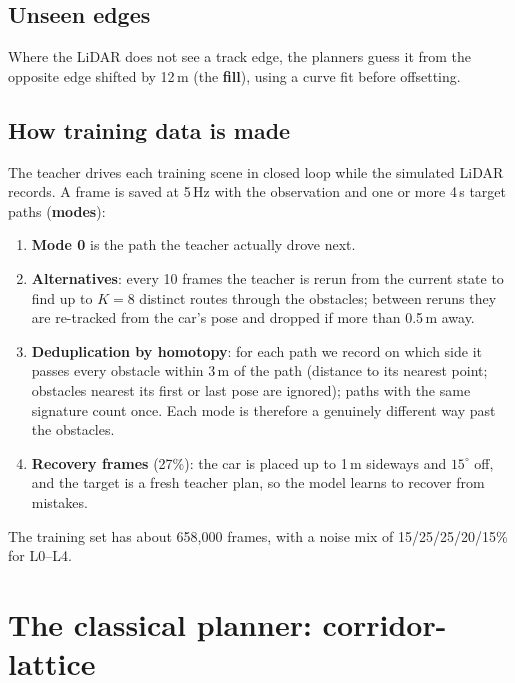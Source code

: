 \documentclass[11pt,a4paper]{article}
\newcommand{\term}[1]{\textbf{#1}}
\begin{document}
\subsection{Unseen edges}
Where the LiDAR does not see a track edge, the planners guess it from the opposite edge shifted by 12\,m
(the \term{fill}), using a curve fit before offsetting.

\subsection{How training data is made}
\label{sec:data}
The teacher drives each training scene in closed loop while the simulated LiDAR records. A frame is saved
at 5\,Hz with the observation and one or more 4\,s target paths (\term{modes}):
\begin{enumerate}[nosep]
  \item \textbf{Mode 0} is the path the teacher actually drove next.
  \item \textbf{Alternatives}: every 10 frames the teacher is rerun from the current state to find up to
        $K=8$ distinct routes through the obstacles; between reruns they are re-tracked from the car's pose
        and dropped if more than 0.5\,m away.
  \item \textbf{Deduplication by homotopy}: for each path we record on which side it passes every obstacle
        within 3\,m of the path (distance to its nearest point; obstacles nearest its first or last pose are
        ignored); paths with the same signature count once. Each mode is therefore a genuinely
        different way past the obstacles.
  \item \textbf{Recovery frames} (27\%): the car is placed up to 1\,m sideways and $15^\circ$ off, and the
        target is a fresh teacher plan, so the model learns to recover from mistakes.
\end{enumerate}
The training set has about 658{,}000 frames, with a noise mix of 15/25/25/20/15\% for L0--L4.

\section{The classical planner: corridor-lattice}
\label{sec:classical}
\end{document}
